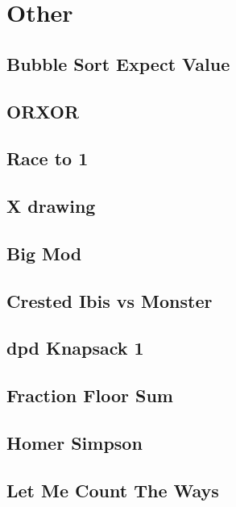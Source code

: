 \section{Other}
        \subsection{Bubble Sort Expect Value}
                
        \subsection{ORXOR}
                
        \subsection{Race to 1}
                
        \subsection{X drawing}
                
        \subsection{Big Mod}
                
        \subsection{Crested Ibis vs Monster}
                
        \subsection{dpd Knapsack 1}
                
        \subsection{Fraction Floor Sum}
                
        \subsection{Homer Simpson}
                
        \subsection{Let Me Count The Ways}
                
